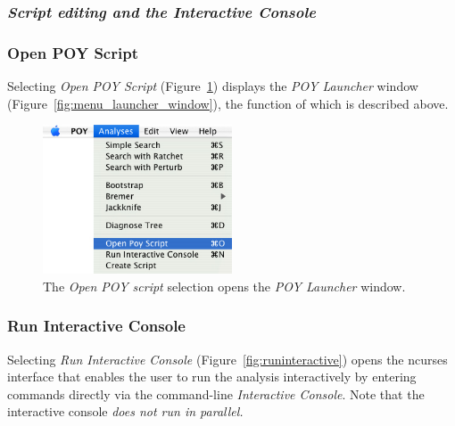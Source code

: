 \subsubsection{\emph{Script editing and the Interactive Console}}

\subsubsection{Open POY Script}

Selecting \emph{Open POY Script} (Figure~\ref{fig:open_poy_script}) displays the \emph{POY Launcher} 
window (Figure~\ref{fig:menu_launcher_window}), the function of which is described above.

\begin{figure}[htpb]
    \begin{center}
        \includegraphics[width=0.5\textwidth]{figures/openpoyscript_menu.jpg}
    \end{center}
    \caption{The \emph{Open POY script} selection opens the \emph{POY Launcher} window.}
    \label{fig:open_poy_script}
\end{figure}

\subsubsection{Run Interactive Console}

Selecting \emph{Run Interactive Console} (Figure~\ref{fig:runinteractive}) opens the ncurses interface
that enables the user to run the analysis interactively by entering
\poy commands directly via the command-line \emph{Interactive
Console}. Note that the interactive console \emph{does not run in parallel.}

